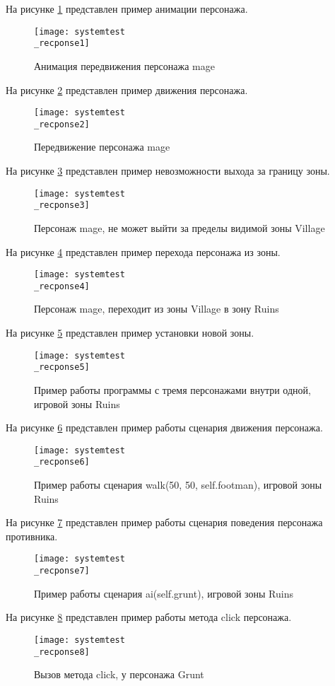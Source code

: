 На рисунке \ref{systemtest_recponse1:image} представлен пример анимации персонажа.
\begin{figure}[H]
	\centering
	\texttt{[image: systemtest\\\_recponse1]}
	\caption{Анимация передвижения персонажа mage}
	\label{systemtest_recponse1:image}
\end{figure}

На рисунке \ref{systemtest_recponse2:image} представлен пример движения персонажа.
\begin{figure}[H]
	\centering
	\texttt{[image: systemtest\\\_recponse2]}
	\caption{Передвижение персонажа mage}
	\label{systemtest_recponse2:image}
\end{figure}

На рисунке \ref{systemtest_recponse3:image} представлен пример невозможности выхода за границу зоны.
\begin{figure}[H]
	\centering
	\texttt{[image: systemtest\\\_recponse3]}
	\caption{Персонаж mage, не может выйти за пределы видимой зоны Village}
	\label{systemtest_recponse3:image}
\end{figure}

На рисунке \ref{systemtest_recponse4:image} представлен пример перехода персонажа из зоны.
\begin{figure}[H]
	\centering
	\texttt{[image: systemtest\\\_recponse4]}
	\caption{Персонаж mage, переходит из зоны Village в зону Ruins}
	\label{systemtest_recponse4:image}
\end{figure}

На рисунке \ref{systemtest_recponse5:image} представлен пример установки новой зоны.
\begin{figure}[H]
	\centering
	\texttt{[image: systemtest\\\_recponse5]}
	\caption{Пример работы программы с тремя персонажами внутри одной, игровой зоны Ruins}
	\label{systemtest_recponse5:image}
\end{figure}

На рисунке \ref{systemtest_recponse6:image} представлен пример работы сценария движения персонажа.
\begin{figure}[H]
	\centering
	\texttt{[image: systemtest\\\_recponse6]}
	\caption{Пример работы сценария walk(50, 50, self.footman), игровой зоны Ruins}
	\label{systemtest_recponse6:image}
\end{figure}

На рисунке \ref{systemtest_recponse7:image} представлен пример работы сценария поведения персонажа противника.
\begin{figure}[H]
	\centering
	\texttt{[image: systemtest\\\_recponse7]}
	\caption{Пример работы сценария ai(self.grunt), игровой зоны Ruins}
	\label{systemtest_recponse7:image}
\end{figure}

На рисунке \ref{systemtest_recponse8:image} представлен пример работы метода click персонажа.
\begin{figure}[H]
	\centering
	\texttt{[image: systemtest\\\_recponse8]}
	\caption{Вызов метода click, у персонажа Grunt}
	\label{systemtest_recponse8:image}
\end{figure}
